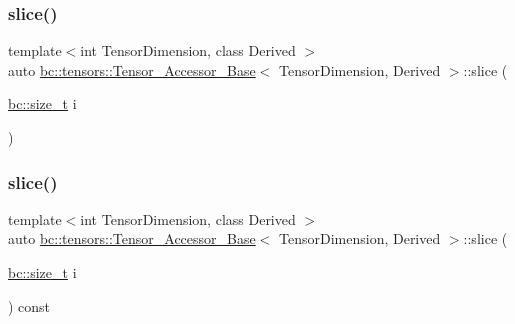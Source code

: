 \mbox{\label{classbc_1_1tensors_1_1Tensor__Accessor__Base_a5496b0377302438d13d6a742690327c3}} 
\subsubsection{\texorpdfstring{slice()}{slice()}\hspace{0.1cm}{\footnotesize\ttfamily [1/4]}}
{\footnotesize\ttfamily template$<$int Tensor\+Dimension, class Derived $>$ \\
auto \hyperlink{classbc_1_1tensors_1_1Tensor__Accessor__Base}{bc\+::tensors\+::\+Tensor\+\_\+\+Accessor\+\_\+\+Base}$<$ Tensor\+Dimension, Derived $>$\+::slice (\begin{DoxyParamCaption}\item[{\hyperlink{namespacebc_aaf8e3fbf99b04b1b57c4f80c6f55d3c5}{bc\+::size\+\_\+t}}]{i }\end{DoxyParamCaption})\hspace{0.3cm}{\ttfamily [inline]}}

\mbox{\label{classbc_1_1tensors_1_1Tensor__Accessor__Base_af2df04474c2c8e1597fff20f4baf7308}} 
\subsubsection{\texorpdfstring{slice()}{slice()}\hspace{0.1cm}{\footnotesize\ttfamily [2/4]}}
{\footnotesize\ttfamily template$<$int Tensor\+Dimension, class Derived $>$ \\
auto \hyperlink{classbc_1_1tensors_1_1Tensor__Accessor__Base}{bc\+::tensors\+::\+Tensor\+\_\+\+Accessor\+\_\+\+Base}$<$ Tensor\+Dimension, Derived $>$\+::slice (\begin{DoxyParamCaption}\item[{\hyperlink{namespacebc_aaf8e3fbf99b04b1b57c4f80c6f55d3c5}{bc\+::size\+\_\+t}}]{i }\end{DoxyParamCaption}) const\hspace{0.3cm}{\ttfamily [inline]}}

